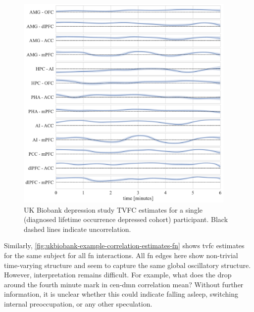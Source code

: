 \begin{figure}[ht]
  \centering
  \includegraphics[width=0.95\textwidth]{fig/ukbiobank/TVFC_predictions/ROI/correlation_UKB1000211_TVFC_predictions}
  \caption{
    UK Biobank depression study TVFC estimates for a single (diagnosed lifetime occurrence depressed cohort) participant.
    Black dashed lines indicate uncorrelation.
  }
  \label{fig:ukbiobank-example-correlation-estimates-roi}
\end{figure}


Similarly, \cref{fig:ukbiobank-example-correlation-estimates-fn} shows \gls{tvfc} estimates for the same subject for all \gls{fn} interactions.
All \gls{fn} edges here show non-trivial time-varying structure and seem to capture the same global oscillatory structure.
%
However, interpretation remains difficult.
For example, what does the drop around the fourth minute mark in \gls{cen}-\gls{dmn} correlation mean?
Without further information, it is unclear whether this could indicate falling asleep, switching internal preoccupation, or any other speculation.


